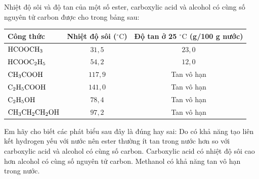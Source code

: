 \documentclass[12pt,a4paper]{article}
\begin{document}
\begin{ex}
Nhiệt độ sôi và độ tan của một số ester, carboxylic acid và alcohol có cùng số nguyên tử carbon được cho trong bảng sau:
\begin{center}
\begin{tabular}{|l|c|c|}
\hline
\textbf{Công thức} & \textbf{Nhiệt độ sôi ($^\circ\text{C}$)} & \textbf{Độ tan ở 25 $^\circ\text{C}$ (g/100 g nước)} \\ \hline
$\ce{HCOOCH3}$ & $31{,}5$ & $23{,}0$ \\ \hline
$\ce{HCOOC2H5}$ & $54{,}2$ & $12{,}0$ \\ \hline
$\ce{CH3COOH}$ & $117{,}9$ & Tan vô hạn \\ \hline
$\ce{C2H5COOH}$ & $141{,}0$ & Tan vô hạn \\ \hline
$\ce{C2H5OH}$ & $78{,}4$ & Tan vô hạn \\ \hline
$\ce{CH3CH2CH2OH}$ & $97{,}2$ & Tan vô hạn \\ \hline
\end{tabular}
\end{center}
Em hãy cho biết các phát biểu sau đây là đúng hay sai:
{\True Do có khả năng tạo liên kết hydrogen yếu với nước nên ester thường ít tan trong nước hơn so với carboxylic acid và alcohol có cùng số carbon.}
{\True Carboxylic acid có nhiệt độ sôi cao hơn alcohol có cùng số nguyên tử carbon.}
{\True Methanol có khả năng tan vô hạn trong nước.}
\end{ex}
\end{document}
